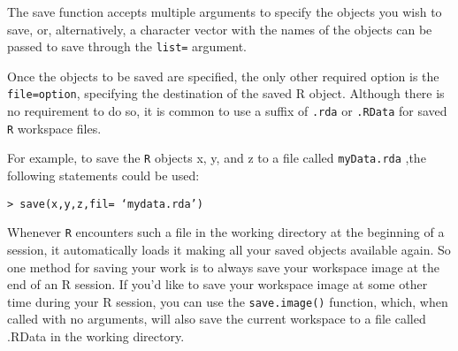 The save function accepts multiple arguments to specify the objects you wish to save, or, alternatively, a character vector with the names of the objects can be passed to save through the \texttt{list=} argument. 

Once the objects to be saved are specified, the only other required option is the \texttt{file=option}, specifying the destination of the saved R object. Although there is no requirement to do so, it is common to use a suffix of \texttt{.rda} or \texttt{.RData} for saved \texttt{R} workspace files.

For example, to save the \texttt{R} objects x, y, and z to a file called \texttt{myData.rda} ,the following statements could be used:

\begin{verbatim}
> save(x,y,z,fil= ‘mydata.rda’)
\end{verbatim}


Whenever \texttt{R} encounters such a file in the working directory at the beginning of a session, it automatically loads it making all your saved objects available again. 
So one method for saving your work is to always save your workspace image at the end of an R session. If you’d like to save your workspace image at some other time during your R session, you can use the \texttt{save.image()} function, which, when called with no arguments, will also save the current workspace to a file called .RData in the working directory.


